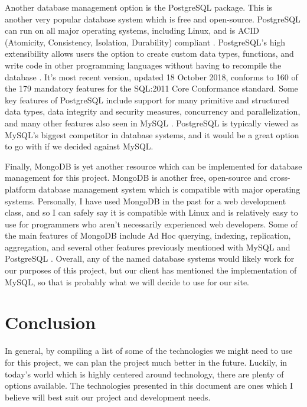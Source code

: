 \documentclass[letterpaper, 10pt, draftclsnofoot,onecolumn]{IEEEtran}
\begin{document}
Another database management option is the PostgreSQL package. This is another very popular database system which is free and open-source. PostgreSQL can run on all major operating systems, including Linux, and is ACID (Atomicity, Consistency, Isolation, Durability) compliant \cite {PostgreSQL}. PostgreSQL's high extensibility allows users the option to create custom data types, functions, and write code in other programming languages without having to recompile the database \cite{PostgreSQL}. It's most recent version, updated 18 October 2018, conforms to 160 of the 179 mandatory features for the SQL:2011 Core Conformance standard. Some key features of PostgreSQL include support for many primitive and structured data types, data integrity and security measures, concurrency and parallelization, and many other features also seen in MySQL \cite{PostgreSQL}. PostgreSQL is typically viewed as MySQL's biggest competitor in database systems, and it would be a great option to go with if we decided against MySQL.

Finally, MongoDB is yet another resource which can be implemented for database management for this project. MongoDB is another free, open-source and cross-platform database management system which is compatible with major operating systems. Personally, I have used MongoDB in the past for a web development class, and so I can safely say it is compatible with Linux and is relatively easy to use for programmers who aren't necessarily experienced web developers. Some of the main features of MongoDB include Ad Hoc querying, indexing, replication, aggregation, and several other features previously mentioned with MySQL and PostgreSQL \cite{MongoDB}. Overall, any of the named database systems would likely work for our purposes of this project, but our client has mentioned the implementation of MySQL, so that is probably what we will decide to use for our site.

\section{Conclusion}
In general, by compiling a list of some of the technologies we might need to use for this project, we can plan the project much better in the future. Luckily, in today's world which is highly centered around technology, there are plenty of options available. The technologies presented in this document are ones which I believe will best suit our project and development needs.


\newpage


\end{document}
